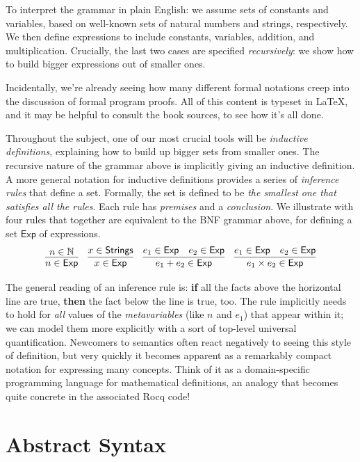 \documentclass{amsbook}
\theoremstyle{definition}
\theoremstyle{remark}
\numberwithin{section}{chapter}
\numberwithin{equation}{chapter}
\begin{document}
To interpret the grammar in plain English: we assume sets of constants and variables, based on well-known sets of natural numbers and strings, respectively.
We then define expressions to include constants, variables, addition, and multiplication.
Crucially, the last two cases are specified \emph{recursively}: we show how to build bigger expressions out of smaller ones.

Incidentally, we're already seeing how many different formal notations creep into the discussion of formal program proofs.
All of this content is typeset in \LaTeX{}\index{\LaTeX{}}, and it may be helpful to consult the book sources, to see how it's all done.

Throughout the subject, one of our most crucial tools will be \emph{inductive definitions}, explaining how to build up bigger sets from smaller ones.
The recursive nature of the grammar above is implicitly giving an inductive definition.
A more general notation for inductive definitions provides a series of \emph{inference rules} that define a set.
Formally, the set is defined to be \emph{the smallest one that satisfies all the rules}.
Each rule has \emph{premises} and a \emph{conclusion}.
We illustrate with four rules that together are equivalent to the BNF grammar above, for defining a set $\mathsf{Exp}$ of expressions.
\encoding
$$\infer{n \in \mathsf{Exp}}{
  n \in \mathbb N
}
\quad \infer{x \in \mathsf{Exp}}{
  x \in \mathsf{Strings}
}
\quad \infer{e_1 + e_2 \in \mathsf{Exp}}{
  e_1 \in \mathsf{Exp}
  & e_2 \in \mathsf{Exp}
}
\quad \infer{e_1 \times e_2 \in \mathsf{Exp}}{
  e_1 \in \mathsf{Exp}
  & e_2 \in \mathsf{Exp}
}$$

The general reading of an inference rule is: \textbf{if} all the facts above the horizontal line are true, \textbf{then} the fact below the line is true, too.
The rule implicitly needs to hold for \emph{all} values of the \emph{metavariables} (like $n$ and $e_1$) that appear within it; we can model them more explicitly with a sort of top-level universal quantification.
Newcomers to semantics often react negatively to seeing this style of definition, but very quickly it becomes apparent as a remarkably compact notation for expressing many concepts.
Think of it as a domain-specific programming language for mathematical definitions, an analogy that becomes quite concrete in the associated Rocq code!

\section{Abstract Syntax}
\end{document}
